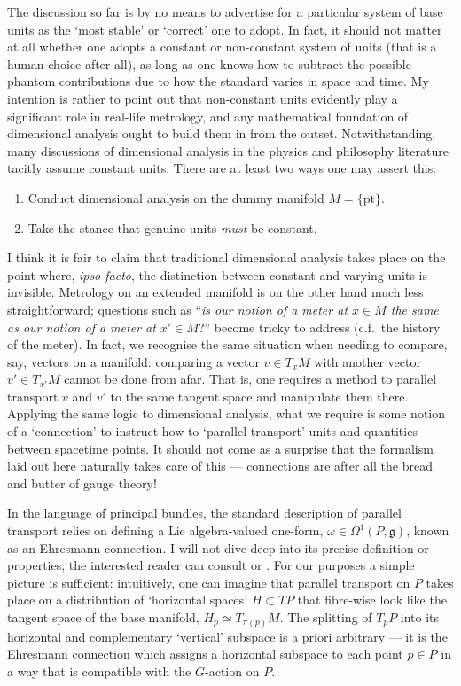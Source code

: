\documentclass[12pt]{article}
\numberwithin{equation}{section}
\begin{document}
The discussion so far is by no means to advertise for a particular system of base units as the `most stable' or `correct' one to adopt. In fact, it should not matter at all whether one adopts a constant or non-constant system of units (that is a human choice after all), as long as one knows how to subtract the possible phantom contributions due to how the standard varies in space and time. My intention is rather to point out that non-constant units evidently play a significant role in real-life metrology, and any mathematical foundation of dimensional analysis ought to build them in from the outset. Notwithstanding, many discussions of dimensional analysis in the physics and philosophy literature tacitly assume constant units. There are at least two ways one may assert this:
\begin{enumerate}
    \item Conduct dimensional analysis on the dummy manifold $M=\{\text{pt}\}$.
    \item Take the stance that genuine units \emph{must} be constant.
\end{enumerate}
I think it is fair to claim that traditional dimensional analysis takes place on the point where, \emph{ipso facto}, the distinction between constant and varying units is invisible. Metrology on an extended manifold is on the other hand much less straightforward; questions such as ``\emph{is our notion of a meter at $x\in M$ the same as our notion of a meter at $x'\in M$}?'' become tricky to address (c.f.~the history of the meter). In fact, we recognise the same situation when needing to compare, say, vectors on a manifold: comparing a vector $v\in T_xM$ with another vector $v'\in T_{x'}M$ cannot be done from afar. That is, one requires a method to parallel transport $v$ and $v'$ to the same tangent space and manipulate them there. Applying the same logic to dimensional analysis, what we require is some notion of a `connection' to instruct how to `parallel transport' units and quantities between spacetime points. It should not come as a surprise that the formalism laid out here naturally takes care of this --- connections are after all the bread and butter of gauge theory!

In the language of principal bundles, the standard description of parallel transport relies on defining a Lie algebra-valued one-form, $\omega\in \Omega^1(P,\mathfrak{g})$, known as an Ehresmann connection. I will not dive deep into its precise definition or properties; the interested reader can consult \citet{KobayashiNomizu1963} or \citet[Appendix A]{Gomes2024}. For our purposes a simple picture is sufficient: intuitively, one can imagine that parallel transport on $P$ takes place on a distribution of `horizontal spaces' $H\subset TP$ that fibre-wise look like the tangent space of the base manifold, $H_p\simeq T_{\pi(p)}M$. The splitting of $T_pP$ into its horizontal and complementary `vertical' subspace is a priori arbitrary --- it is the Ehresmann connection which assigns a horizontal subspace to each point $p\in P$ in a way that is compatible with the $G$-action on $P$. 
\end{document}
